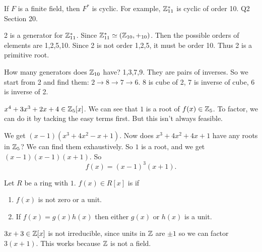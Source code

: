 \documentclass[class=article,crop=false]{standalone}
\begin{document}
\begin{note}
	If $ F$ is a finite field, then  $ F^* $ is cyclic. For example, $\mathbb{Z}_{11}^* $ is cyclic of order 10. Q2 Section 20. 

	2 is a generator for $ \mathbb{Z}_{11}^* $. Since $ \mathbb{Z}_{11}^* \simeq (\mathbb{Z}_{10},+_{ 10} )$. Then the possible orders of elements are 1,2,5,10. Since 2 is not order 1,2,5, it must be order 10. Thus 2 is a primitive root.

	How many generators does $ \mathbb{Z}_{10}$ have? 1,3,7,9. They are pairs of inverses. So we start from 2 and find them: $ 2 \to 8 \to 7 \to 6$. 8 is cube of 2, 7 is inverse of cube, 6 is inverse of 2.

\end{note}
\begin{eg}[23.4]
	$ x^{4}+ 3x^3+2x+4 \in \mathbb{Z}_5[x]$. We can see that $ 1$ is a root of  $ f(x) \in \mathbb{Z}_5$. To factor, we can do it by tacking the easy terms first. But this isn't always feasible.

	We get $ (x-1)(x^3+4x^2-x+1)$. Now does $ x^3 + 4x^2 + 4x + 1$ have any roots in $ \mathbb{Z}_5$? We can find them exhaustively. So $ 1$ is a root, and we get $ (x-1)(x-1)(x+1)$. So 
	 \[
		 f(x) = (x-1)^3 (x+1)
	.\]
\end{eg}

\begin{defn}[irreducible]
	Let $ R$ be a ring with  $ 1$.  $ f(x) \in R[x]$ is  if 
	\begin{enumerate}[label=(\roman*)]
		\item $ f(x)$ is not zero or a unit.
		\item  If $ f(x) = g(x)h(x)$ then either $ g(x)$ or  $ h(x)$ is a unit. 
	\end{enumerate}
\end{defn}

\begin{note}[]
	$ 3x+3 \in \mathbb{Z}[x]$ is not irreducible, since units in $ \mathbb{Z}$ are $ \pm 1$ so we can factor  $ 3(x+1)$. This works because  $ \mathbb{Z}$ is not a field. 
\end{note}
\end{document}
